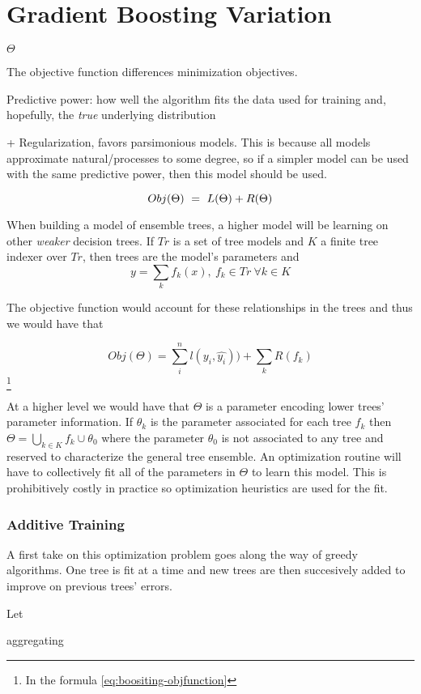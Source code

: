\section{Gradient Boosting Variation}


$\Theta$

The objective function differences minimization objectives. 

Predictive power: how well the algorithm fits the data used for training and, hopefully, the \textit{true} underlying distribution

+ Regularization, favors parsimonious models. This is because all models approximate natural/processes to some degree, so if a simpler model can be used with the same predictive power, then this model should be used.  

\begin{equation} \label{eq:objFunction}
Obj(\Theta) \ = \ L(\Theta) + R(\Theta)
\\
\end{equation}

When building a model of ensemble trees, a higher model will be learning on other \textit{weaker} decision trees. If $Tr$ is a set of tree models and $K$ a finite tree indexer over $Tr$, then trees are the model's parameters and
\[ y = \sum_k f_k(x) , \ f_k \in Tr \ \forall k \in K \]
 
The objective function would account for these relationships in the trees and thus we would have that
 
\[ Obj(\Theta) = \sum_i^n l(y_i,\hat{y_i}))  +  \sum_k R(f_k) \] \label{eq:boositing-objfunction} \footnote{In the formula \ref{eq:boositing-objfunction} }
%    

At a higher level we would have that $\Theta$ is a parameter encoding lower trees' parameter information. If $\theta_k$ is the parameter associated for each tree $f_k$ then $\Theta =  \bigcup_{k \in K} f_k  \cup \theta_0$ where the parameter $\theta_0$ is not associated to any tree and reserved to characterize the general tree ensemble. An optimization routine will have to collectively fit all of the parameters in $\Theta$ to learn this model. This is prohibitively costly in practice so optimization heuristics are used for the fit. 

\subsubsection{Additive Training}

A first take on this optimization problem goes along the way of greedy algorithms. One tree is fit at a time and new trees are then succesively added to improve on previous trees' errors.

Let 

aggregating 



